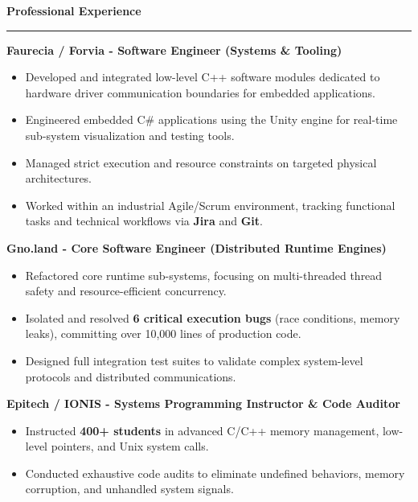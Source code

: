 \documentclass[9pt]{extarticle}
\begin{document}
\par\vspace{5pt}

{\large\bfseries Professional Experience}
\par\vspace{-8pt}
\rule{\linewidth}{0.4pt}
\par\vspace{5pt}

{\bfseries Faurecia / Forvia - Software Engineer (Systems \& Tooling)}
\begin{itemize}[noitemsep, topsep=0pt]
    \item Developed and integrated low-level C++ software modules dedicated to hardware driver communication boundaries for embedded applications.
    \item Engineered embedded C\# applications using the Unity engine for real-time sub-system visualization and testing tools.
    \item Managed strict execution and resource constraints on targeted physical architectures.
    \item Worked within an industrial Agile/Scrum environment, tracking functional tasks and technical workflows via {\bfseries Jira} and {\bfseries Git}.
\end{itemize}

\par\vspace{5pt}

{\bfseries Gno.land - Core Software Engineer (Distributed Runtime Engines)}
\begin{itemize}[noitemsep, topsep=0pt]
    \item Refactored core runtime sub-systems, focusing on multi-threaded thread safety and resource-efficient concurrency.
    \item Isolated and resolved {\bfseries 6 critical execution bugs} (race conditions, memory leaks), committing over 10,000 lines of production code.
    \item Designed full integration test suites to validate complex system-level protocols and distributed communications.
\end{itemize}

\par\vspace{5pt}

{\bfseries Epitech / IONIS - Systems Programming Instructor \& Code Auditor}
\begin{itemize}[noitemsep, topsep=0pt]
    \item Instructed {\bfseries 400+ students} in advanced C/C++ memory management, low-level pointers, and Unix system calls.
    \item Conducted exhaustive code audits to eliminate undefined behaviors, memory corruption, and unhandled system signals.
\end{itemize}
\end{document}
